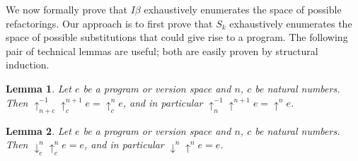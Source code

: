\documentclass{article}
\newcommand{\shift}[1]{\uparrow^{#1}}
\newcommand{\downshift}[1]{\downarrow^{#1}}
\newtheorem{lemma}{Lemma}
\begin{document}
We now formally prove that $I\beta$ exhaustively enumerates the space of possible refactorings.
Our approach is to first prove that $S_k$ exhaustively enumerates
the space of possible substitutions that
could give rise to a program.
The following pair of technical lemmas are useful; both are easily proven by structural induction.
\begin{lemma}
  Let $e$ be a program or version space and $n$, $c$ be natural numbers. \\Then $\shift{-1}_{n + c}\shift{n + 1}_ce = \shift{n}_c e$,
  and in particular $\shift{-1}_{n}\shift{n + 1}e = \shift{n} e$.
\label{neutralizeShift}\end{lemma}
\begin{lemma}
  Let $e$ be a program or version space and $n$, $c$ be natural numbers. \\Then $\downshift{n}_{c}\shift{n}_ce =  e$,
  and in particular $\downshift{n}\shift{n}e =  e$.
  \label{neutralizeDown}
\end{lemma}
\end{document}
